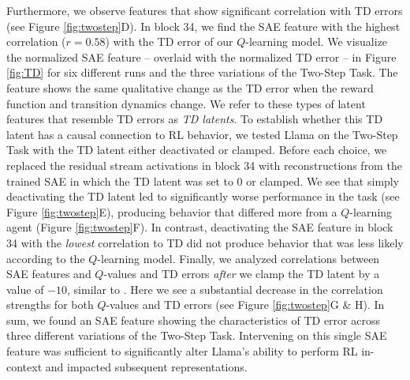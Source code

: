 \documentclass{article} %
\begin{document}

Furthermore, we observe features that show significant correlation with TD errors (see Figure \ref{fig:twostep}D). In block 34, we find the SAE feature with the highest correlation ($r = 0.58$) with the TD error of our $Q$-learning model. We visualize the normalized SAE feature -- overlaid with the normalized TD error -- in Figure \ref{fig:TD} for six different runs and the three variations of the Two-Step Task. The feature shows the same qualitative change as the TD error when the reward function and transition dynamics change. We refer to these types of latent features that resemble TD errors as \emph{TD latents}. To establish whether this TD latent has a causal connection to RL behavior, we tested Llama on the Two-Step Task with the TD latent either deactivated or clamped. Before each choice, we replaced the residual stream activations in block 34 with reconstructions from the trained SAE in which the TD latent was set to 0 or clamped. We see that simply deactivating the TD latent led to significantly worse performance in the task (see Figure \ref{fig:twostep}E), producing behavior that differed more from a $Q$-learning agent (Figure \ref{fig:twostep}F). In contrast, deactivating the SAE feature in block 34 with the \emph{lowest} correlation to TD did not produce behavior that was less likely according to the $Q$-learning model. Finally, we analyzed correlations between SAE features and $Q$-values and TD errors \emph{after} we clamp the TD latent by a value of $-10$, similar to \cite{templeton2024scaling}. Here we see a substantial decrease in the correlation strengths for both $Q$-values and TD errors (see Figure \ref{fig:twostep}G \& H). In sum, we found an SAE feature showing the characteristics of TD error across three different variations of the Two-Step Task. Intervening on this single SAE feature was sufficient to significantly alter Llama's ability to perform RL in-context and impacted subsequent representations. 
\end{document}

